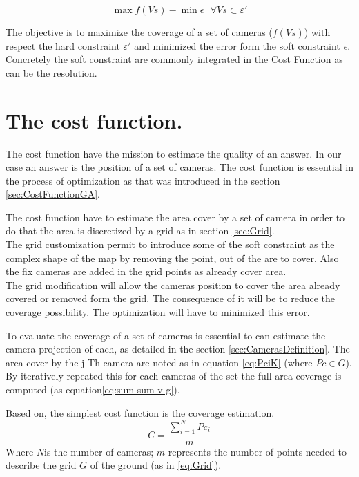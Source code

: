   \begin{equation}\label{eq:constraintEpsilon}
 	\max f(Vs) - \min \epsilon  \mbox{  } \forall Vs \subset \varepsilon'
 \end{equation}
 
The objective is to maximize the coverage of a set of cameras ($f(Vs)$) with respect the hard constraint $\varepsilon'$ and minimized the error form the soft constraint $\epsilon$.
Concretely the soft constraint are commonly integrated in the Cost Function as can be the resolution. 


\section{The cost function.}

The cost function have the mission to estimate the quality of an answer. In our case an answer is the position  of a set of cameras. The cost function is essential in the process of optimization as that was introduced in the section \ref{sec:CostFunctionGA}.

The cost function have to estimate the area cover by a set of camera in order to do that the area is discretized by a grid as in section \ref{sec:Grid}. \\
The grid customization permit to introduce some of the soft constraint as the complex shape of the map by removing the point, out of the are to cover. Also the fix cameras are added in the grid points as already cover area. \\
The grid modification will allow the cameras position to cover the area already covered or removed form the grid. The consequence of it will be to reduce the coverage possibility. The optimization will have to minimized this error.

To evaluate the coverage of a set of cameras is essential to can estimate the camera projection of each, as detailed in the section \ref{sec:CamerasDefinition}. The area cover by the j-Th camera are noted as in equation \ref{eq:PciK} (where $Pc\in G$). By iteratively repeated this for each cameras of the set the full area coverage is computed (as equation\ref{eq:sum sum v g}). 

Based on, the  simplest cost function is the coverage estimation.
\begin{equation}\label{eq:CostFBase}
C =  \frac{\sum_{i=1}^N{Pc_i} }{m}   
\end{equation}
Where $N $is the number of cameras; 
$m$ represents the number of points needed to describe the grid $G$ of the ground (as in \ref{eq:Grid}).\\

